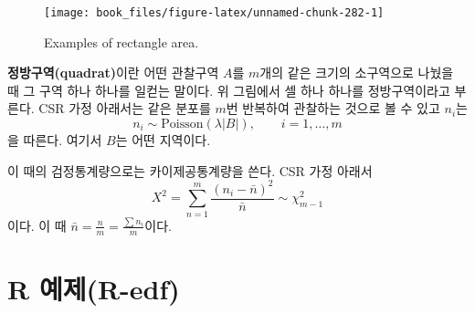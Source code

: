 \documentclass[b5paper,]{scrbook}
\theoremstyle{plain}
\theoremstyle{definition}
\numberwithin{equation}{section}
\begin{document}
\begin{figure}

{\centering \texttt{[image: book\_files/figure-latex/unnamed-chunk-282-1]} 

}

\caption{Examples of rectangle area.}\label{fig:unnamed-chunk-282}
\end{figure}

\textbf{정방구역(quadrat)}이란 어떤 관찰구역 \(A\)를 \(m\)개의 같은
크기의 소구역으로 나눴을 때 그 구역 하나 하나를 일컫는 말이다. 위
그림에서 셀 하나 하나를 정방구역이라고 부른다. CSR 가정 아래서는 같은
분포를 \(m\)번 반복하여 관찰하는 것으로 볼 수 있고 \(n_{i}\)는
\[n_{i} \sim \text{Poisson}(\lambda |B|),\qquad{i=1,\ldots, m}\] 을
따른다. 여기서 \(B\)는 어떤 지역이다.

이 때의 검정통계량으로는 카이제공통계량을 쓴다. CSR 가정 아래서
\[X^{2}=\sum_{n=1}^{m}\frac{(n_{i}-\bar{n})^{2}}{\bar{n}} \sim \chi_{m-1}^{2}\]
이다. 이 때 \(\bar{n}=\frac{n}{m}=\frac{\sum n_{i}}{m}\)이다.

\section{R 예제(R-edf)}\label{r-r-edf}
\end{document}
